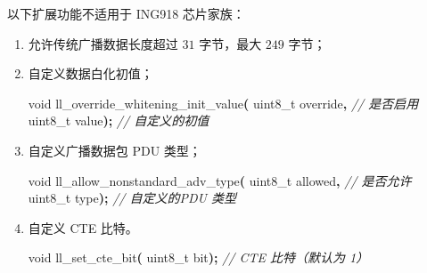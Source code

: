 \documentclass[
  12pt,
]{book}
\newenvironment{Shaded}{\begin{snugshade}}{\end{snugshade}}
\newcommand{\CommentTok}[1]{\textcolor[rgb]{0.56,0.35,0.01}{\textit{#1}}}
\newcommand{\DataTypeTok}[1]{\textcolor[rgb]{0.13,0.29,0.53}{#1}}
\newcommand{\NormalTok}[1]{#1}
\newcommand{\OperatorTok}[1]{\textcolor[rgb]{0.81,0.36,0.00}{\textbf{#1}}}
\begin{document}
以下扩展功能不适用于 ING918 芯片家族：

\begin{enumerate}
\def\labelenumi{\arabic{enumi}.}
\item
  允许传统广播数据长度超过 \(31\) 字节，最大 \(249\) 字节；
\item
  自定义数据白化初值；

\begin{Shaded}
\begin{Highlighting}[]
\DataTypeTok{void}\NormalTok{ ll\_override\_whitening\_init\_value}\OperatorTok{(}
  \DataTypeTok{uint8\_t}\NormalTok{ override}\OperatorTok{,} \CommentTok{// 是否启用}
  \DataTypeTok{uint8\_t}\NormalTok{ value}\OperatorTok{);}   \CommentTok{// 自定义的初值}
\end{Highlighting}
\end{Shaded}
\item
  自定义广播数据包 PDU 类型；

\begin{Shaded}
\begin{Highlighting}[]
\DataTypeTok{void}\NormalTok{ ll\_allow\_nonstandard\_adv\_type}\OperatorTok{(}
  \DataTypeTok{uint8\_t}\NormalTok{ allowed}\OperatorTok{,}  \CommentTok{// 是否允许}
  \DataTypeTok{uint8\_t}\NormalTok{ type}\OperatorTok{);}    \CommentTok{// 自定义的PDU 类型}
\end{Highlighting}
\end{Shaded}
\item
  自定义 CTE 比特。

\begin{Shaded}
\begin{Highlighting}[]
\DataTypeTok{void}\NormalTok{ ll\_set\_cte\_bit}\OperatorTok{(}
  \DataTypeTok{uint8\_t}\NormalTok{ bit}\OperatorTok{);}     \CommentTok{// CTE 比特（默认为 1）}
\end{Highlighting}
\end{Shaded}
\end{enumerate}

  

\backmatter
\printindex
\end{document}
